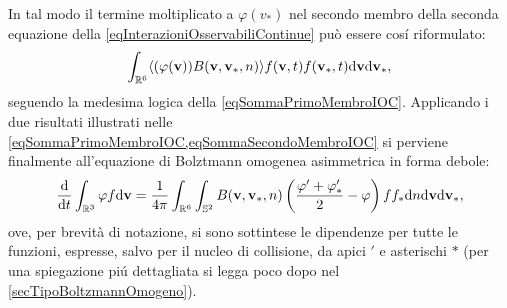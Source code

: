                 In tal modo il termine moltiplicato a \(\varphi(v_*)\) nel secondo membro della seconda equazione della \eqref{eqInterazioniOsservabiliContinue} può essere cosí riformulato:
                \begin{equation}
                    \label{eqSommaSecondoMembroIOC}
                    \int_{\mathbb R^6}\langle(\varphi(\mathbf v))
                    B(\mathbf v,\mathbf v_*,n)\rangle
                    f(\mathbf v,t)f(\mathbf v_*,t)\mathrm{d}\mathbf v\mathrm{d}\mathbf v_*,
                \end{equation}
                seguendo la medesima logica della \eqref{eqSommaPrimoMembroIOC}. Applicando i due risultati illustrati nelle \cref{eqSommaPrimoMembroIOC,eqSommaSecondoMembroIOC} si perviene finalmente all'equazione di Bolztmann omogenea asimmetrica in forma debole:
                \begin{equation}
                    \label{eqFormaDeboleBoltzmannOmogeneoAssimmetricoGas}
                    \frac{\mathrm{d}}{\mathrm{d}t}\int_{\mathbb R^3}\varphi f\mathrm{d}\mathbf v=
                    \frac1{4\pi}\int_{\mathbb R^6}\int_{\mathbb S^2}
                        B(\mathbf v,\mathbf v_*,n)
                        \left(\frac{\varphi'+\varphi'_*}2-\varphi\right)
                    ff_*\mathrm{d} n\mathrm{d}\mathbf v\mathrm{d}\mathbf v_*,
                \end{equation}
                ove, per brevità di notazione, si sono sottintese le dipendenze per tutte le funzioni, espresse, salvo per il nucleo di collisione, da apici \(\prime\) e asterischi \(*\) (per una spiegazione piú dettagliata si legga poco dopo nel \cref{secTipoBoltzmannOmogeno}).
               
